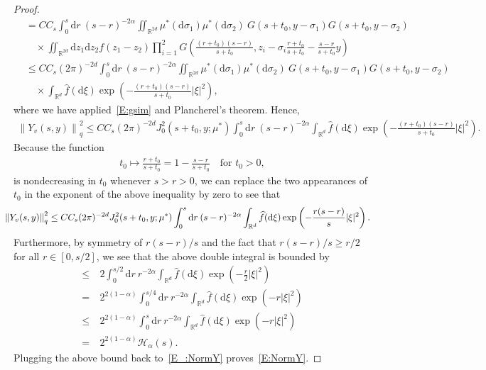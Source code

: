 \documentclass[a4paper,11pt]{article}%
\theoremstyle{plain}
\theoremstyle{definition}
\numberwithin{equation}{section}
\newcommand{\R}{\mathbb{R}}
\newcommand{\Norm}[1]{\left\| #1 \right\|}
\newcommand{\ud}{\ensuremath{\mathrm{d}}}
\begin{document}
\begin{proof}
\begin{align*}
    & = C C_s\int_0^s \ud r \: (s-r)^{-2\alpha} \iint_{\R^{2d}} \mu^* (\ud \sigma_1) \mu^* (\ud \sigma_2)\: G(s + t_0,y-\sigma_1)G(s + t_0,y-\sigma_2)                         \\
    & \quad \times\iint_{\R^{2d}} \ud z_1\ud z_2 f(z_1-z_2) \prod_{i = 1}^2 G\left(\frac{(r+t_0)(s-r)}{s + t_0}, z_i-\sigma_i\frac{r + t_0}{s + t_0}-\frac{s-r}{s+t_0}y\right) \\
    & \le C C_s(2\pi)^{-2d} \int_0^s \ud r \: (s-r)^{-2\alpha} \iint_{\R^{2d}}\mu^* (\ud \sigma_1) \mu^* (\ud \sigma_2)\: G(s + t_0,y-\sigma_1)G(s + t_0, y-\sigma_2)          \\
    & \quad \times \int_{\R^d} \widehat{f}(\ud \xi) \exp\left(-\frac{(r + t_0)(s-r)}{s+ t_0}|\xi|^2\right),
  \end{align*}
  where we have applied~\eqref{E:gsim} and Plancherel's theorem. Hence,
  \begin{align*}
   \Norm{Y_v(s,y)}_q^2 \le C C_s (2\pi)^{-2d} J_0^2\left(s + t_0,y;\mu^*\right) \int_0^s \ud r \: (s-r)^{-2\alpha} \int_{\R^d} \widehat{f}(\ud \xi)\exp\left(-\frac{(r + t_0)(s-r)}{s + t_0}|\xi|^2\right).
  \end{align*}
  Because the function
  \begin{align*}
    t_0 \mapsto \frac{r + t_0}{s + t_0} = 1- \frac{s-r}{s+t_0} \quad \text{for $t_0 > 0$},
  \end{align*}
  is nondecreasing in $t_0 $ whenever $s > r > 0$, we can replace the two appearances of $t_0$ in
  the exponent of the above inequality by zero to see that
  \begin{equation}\label{E_:NormY}
    \hspace{-1em}
    \Norm{Y_v(s,y)}_q^2 \le C C_s (2\pi)^{-2d} J_0^2 (s + t_0,y;\mu^*) \int_0^s \ud r \: (s-r)^{-2\alpha} \int_{\R^d} \widehat{f}(\ud \xi)\exp\left(-\frac{r(s-r)}{s}|\xi|^2\right).
  \end{equation}
  Furthermore, by symmetry of $r(s-r)/s$ and the fact that $r(s-r)/s \ge r/2$ for all $r\in
  [0,s/2]$, we see that the above double integral is bounded by
  \begin{align*}
    \le & \: 2\int_0^{s/2} \ud r \: r^{-2\alpha}\int_{\R^d} \widehat{f}(\ud \xi)\exp\left(-\frac{r}{2}|\xi|^2\right)      \\
    =   & \: 2^{2(1-\alpha)} \int_0^{s/4} \ud r \: r^{-2\alpha}\int_{\R^d} \widehat{f}(\ud \xi)\exp\left(-r|\xi|^2\right) \\
    \le & \: 2^{2(1-\alpha)} \int_0^{s} \ud r \: r^{-2\alpha}\int_{\R^d} \widehat{f}(\ud \xi)\exp\left(-r|\xi|^2\right)   \\
    =   & \: 2^{2(1-\alpha)} \mathcal{H}_\alpha(s).
  \end{align*}
  Plugging the above bound back to~\eqref{E_:NormY} proves~\eqref{E:NormY}. \bigskip


\end{proof}
\end{document}
